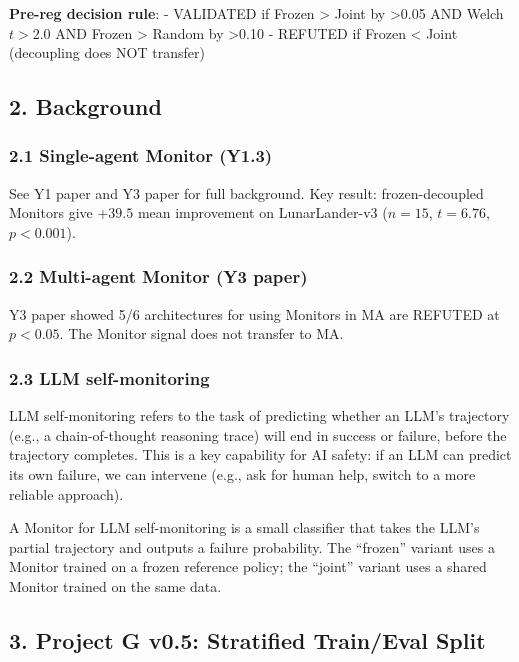 \documentclass[
]{article}
\begin{document}
\textbf{Pre-reg decision rule}: - VALIDATED if Frozen \textgreater{}
Joint by \textgreater0.05 AND Welch \(t > 2.0\) AND Frozen
\textgreater{} Random by \textgreater0.10 - REFUTED if Frozen
\textless{} Joint (decoupling does NOT transfer)

\subsection{2. Background}\label{background}

\subsubsection{2.1 Single-agent Monitor
(Y1.3)}\label{single-agent-monitor-y1.3}

See Y1 paper and Y3 paper for full background. Key result:
frozen-decoupled Monitors give \(+39.5\) mean improvement on
LunarLander-v3 (\(n=15\), \(t=6.76\), \(p<0.001\)).

\subsubsection{2.2 Multi-agent Monitor (Y3
paper)}\label{multi-agent-monitor-y3-paper}

Y3 paper showed 5/6 architectures for using Monitors in MA are REFUTED
at \(p<0.05\). The Monitor signal does not transfer to MA.

\subsubsection{2.3 LLM self-monitoring}\label{llm-self-monitoring}

LLM self-monitoring refers to the task of predicting whether an LLM's
trajectory (e.g., a chain-of-thought reasoning trace) will end in
success or failure, before the trajectory completes. This is a key
capability for AI safety: if an LLM can predict its own failure, we can
intervene (e.g., ask for human help, switch to a more reliable
approach).

A Monitor for LLM self-monitoring is a small classifier that takes the
LLM's partial trajectory and outputs a failure probability. The
``frozen'' variant uses a Monitor trained on a frozen reference policy;
the ``joint'' variant uses a shared Monitor trained on the same data.

\subsection{3. Project G v0.5: Stratified Train/Eval
Split}\label{project-g-v0.5-stratified-traineval-split}
\end{document}
